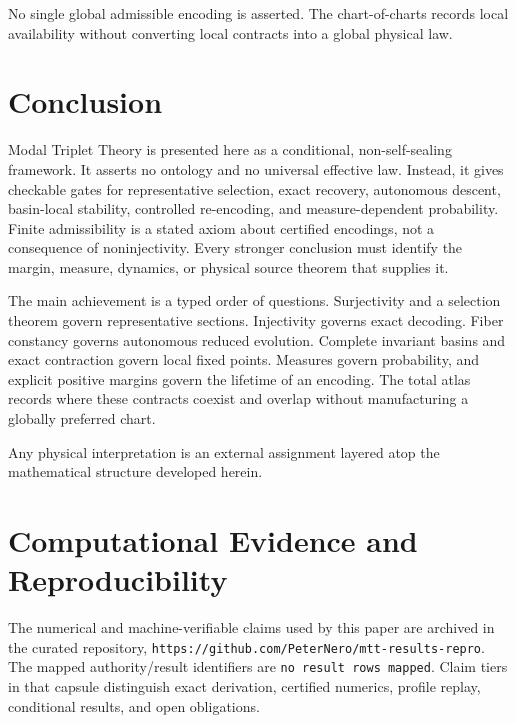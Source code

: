 \documentclass[11pt]{article}
\theoremstyle{plain}
\theoremstyle{plain}
\begin{document}
No single global admissible encoding is asserted.  The chart-of-charts
records local availability without converting local contracts into a global
physical law.


\section*{Conclusion}

\noindent
Modal Triplet Theory is presented here as a conditional, non-self-sealing
framework. It asserts no ontology and no universal effective law.
Instead, it gives checkable gates for representative selection, exact
recovery, autonomous descent, basin-local stability, controlled
re-encoding, and measure-dependent probability.  Finite admissibility is a
stated axiom about certified encodings, not a consequence of noninjectivity.
Every stronger conclusion must identify the margin, measure, dynamics, or
physical source theorem that supplies it.

\medskip

\noindent
The main achievement is a typed order of questions.  Surjectivity and a
selection theorem govern representative sections.  Injectivity governs exact
decoding.  Fiber constancy governs autonomous reduced evolution.  Complete
invariant basins and exact contraction govern local fixed points.  Measures
govern probability, and explicit positive margins govern the lifetime of an
encoding.  The total atlas records where these contracts coexist and overlap
without manufacturing a globally preferred chart.

\vspace{1em}

\noindent
Any physical interpretation is an external assignment layered atop the
mathematical structure developed herein.
\bigskip
\nocite{Nero2026_MTT_Admissibility_Encodings_Structure,Nero2025_MTT_Foundation,Nero2025_FixedPoints_I,Nero2025_FixedPoints_II,Nero2025_FixedPoints_III,Nero2025_FixedPoints_IV,Nero2025_FixedPoints_V,Nero2025_FixedPoints_VI,Nero2026_ProjectionAdmissibility_Principle}


\section*{Computational Evidence and Reproducibility}
The numerical and machine-verifiable claims used by this paper are archived in the curated repository, \texttt{https://github.com/PeterNero/mtt-results-repro}. The mapped authority/result identifiers are \texttt{no result rows mapped}. Claim tiers in that capsule distinguish exact derivation, certified numerics, profile replay, conditional results, and open obligations.
\end{document}
